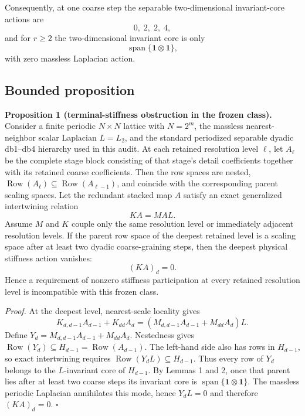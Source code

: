\documentclass[11pt,a4paper]{article}
\newcommand{\Row}{\operatorname{Row}}
\begin{document}
Consequently, at one coarse step the separable two-dimensional invariant-core actions are
\begin{equation}
0,\;2,\;2,\;4,
\end{equation}
and for $r\ge2$ the two-dimensional invariant core is only
\begin{equation}
\operatorname{span}\{\mathbf1\otimes\mathbf1\},
\end{equation}
with zero massless Laplacian action.

\subsection{Bounded proposition}
\textbf{Proposition 1 (terminal-stiffness obstruction in the frozen class).}
Consider a finite periodic $N\times N$ lattice with $N=2^m$, the massless nearest-neighbor scalar Laplacian $L=L_2$, and the standard periodized separable dyadic db1--db4 hierarchy used in this audit. At each retained resolution level $\ell$, let $A_\ell$ be the complete stage block consisting of that stage's detail coefficients together with its retained coarse coefficients. Then the row spaces are nested, $\Row(A_\ell)\subseteq\Row(A_{\ell-1})$, and coincide with the corresponding parent scaling spaces. Let the redundant stacked map $A$ satisfy an exact generalized intertwining relation
\begin{equation}
KA=MAL.
\end{equation}
Assume $M$ and $K$ couple only the same resolution level or immediately adjacent resolution levels. If the parent row space of the deepest retained level is a scaling space after at least two dyadic coarse-graining steps, then the deepest physical stiffness action vanishes:
\begin{equation}
(KA)_d=0.
\end{equation}
Hence a requirement of nonzero stiffness participation at every retained resolution level is incompatible with this frozen class.

\textit{Proof.}
At the deepest level, nearest-scale locality gives
\begin{equation}
K_{d,d-1}A_{d-1}+K_{dd}A_d
=\left(M_{d,d-1}A_{d-1}+M_{dd}A_d\right)L.
\end{equation}
Define $Y_d=M_{d,d-1}A_{d-1}+M_{dd}A_d$. Nestedness gives $\Row(Y_d)\subseteq H_{d-1}=\Row(A_{d-1})$. The left-hand side also has rows in $H_{d-1}$, so exact intertwining requires $\Row(Y_dL)\subseteq H_{d-1}$. Thus every row of $Y_d$ belongs to the $L$-invariant core of $H_{d-1}$. By Lemmas 1 and 2, once that parent lies after at least two coarse steps its invariant core is $\operatorname{span}\{\mathbf1\otimes\mathbf1\}$. The massless periodic Laplacian annihilates this mode, hence $Y_dL=0$ and therefore $(KA)_d=0$. \hfill$\square$
\end{document}
